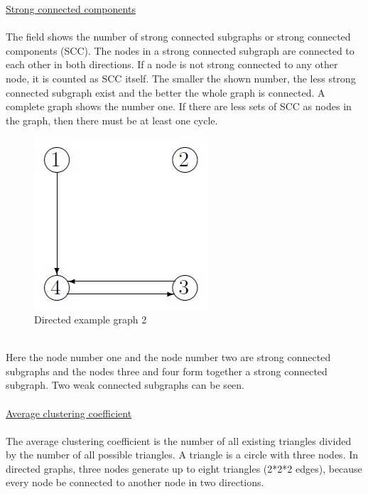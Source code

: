 \documentclass[12pt]{report}
\begin{document}
\underline{Strong connected components}\\
\\ 
The field shows the number of strong connected subgraphs or strong connected components (SCC). The nodes in a strong connected subgraph are connected to each other in both directions. If a node is not strong connected to any other node, it is counted as SCC itself. The smaller the shown number, the less strong connected subgraph exist and the better the whole graph is connected. A complete graph shows the number one. If there are less sets of SCC as nodes in the graph, then there must be at least one cycle.\\
\begin{figure}[h]
\centering
\includegraphics[scale=.6]{graph4}
\caption{Directed example graph 2}
\label{FIG:abb48}
\end{figure}
\\
Here the node number one and the node number two are strong connected subgraphs and the nodes three and four form together a strong connected subgraph. Two weak connected subgraphs can be seen.\\
\\
\underline{Average clustering coefficient}\\
\\
The average clustering coefficient is the number of all existing triangles divided by the number of all possible triangles. A triangle is a circle with three nodes. In directed graphs, three nodes generate up to eight triangles (2*2*2 edges), because every node be connected to another node in two directions.\\
\end{document}
